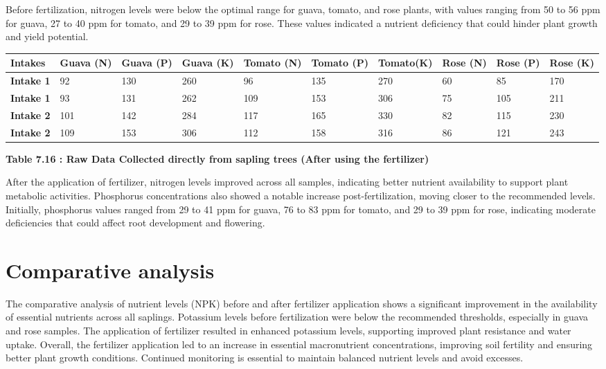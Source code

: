 \documentclass{book} %
\begin{document}
Before fertilization, nitrogen levels were below the optimal range for guava, tomato, and rose plants, with values ranging from 50 to 56 ppm for guava, 27 to 40 ppm for tomato, and 29 to 39 ppm for rose. These values indicated a nutrient deficiency that could hinder plant growth and yield potential.\textbf{}

\begin{tabular}{|p{0.4in}|p{0.4in}|p{0.5in}|p{0.4in}|p{0.4in}|p{0.4in}|p{0.4in}|p{0.4in}|p{0.4in}|p{0.4in}|} \hline 
\textbf{Intakes} & \textbf{Guava (N)} & \textbf{Guava (P)} & \textbf{Guava (K)} & \textbf{Tomato (N)} & \textbf{Tomato (P)} & \textbf{Tomato\newline (K)} & \textbf{Rose (N)} & \textbf{Rose (P)} & \textbf{Rose (K)} \\ \hline 
\textbf{Intake 1} & 92 & 130 & 260 & 96 & 135 & 270 & 60 & 85 & 170 \\ \hline 
\textbf{Intake 1} & 93 & 131 & 262 & 109 & 153 & 306 & 75 & 105 & 211 \\ \hline 
\textbf{Intake 2} & 101 & 142 & 284 & 117 & 165 & 330 & 82 & 115 & 230 \\ \hline 
\textbf{Intake 2} & 109 & 153 & 306 & 112 & 158 & 316 & 86 & 121 & 243 \\ \hline 
\end{tabular}

\textbf{Table 7.16 : Raw Data Collected directly from sapling trees (After using the fertilizer)}

\noindent After the application of fertilizer, nitrogen levels improved across all samples, indicating better nutrient availability to support plant metabolic activities. Phosphorus concentrations also showed a notable increase post-fertilization, moving closer to the recommended levels. Initially, phosphorus values ranged from 29 to 41 ppm for guava, 76 to 83 ppm for tomato, and 29 to 39 ppm for rose, indicating moderate deficiencies that could affect root development and flowering.

\noindent \textbf{}

\noindent 
\section{Comparative analysis}

\noindent The comparative analysis of nutrient levels (NPK) before and after fertilizer application shows a significant improvement in the availability of essential nutrients across all saplings. Potassium levels before fertilization were below the recommended thresholds, especially in guava and rose samples. The application of fertilizer resulted in enhanced potassium levels, supporting improved plant resistance and water uptake. Overall, the fertilizer application led to an increase in essential macronutrient concentrations, improving soil fertility and ensuring better plant growth conditions. Continued monitoring is essential to maintain balanced nutrient levels and avoid excesses.
\end{document}
